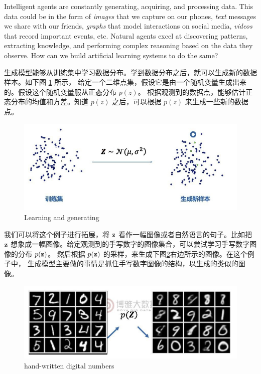 Intelligent agents are constantly generating, acquiring, and processing
data. This data could be in the form of {\em images} that we capture on our
phones, {\em text} messages we share with our friends, {\em graphs} that model
interactions on social media, {\em videos} that record important events,
etc. Natural agents excel at discovering patterns, extracting
knowledge, and performing complex reasoning based on the data they observe. How
can we build artificial learning systems to do the same?

生成模型能够从训练集中学习数据分布。学到数据分布之后，就可以生成新的数据样本。如下图 \ref{fig:dgm_generating_data} 所示，
给定一个二维点集，假设它是由一个随机变量生成出来的。假设这个随机变量服从正态分布 $p(z)$。
根据观测到的数据点，能够估计正态分布的均值和方差。知道 $p(z)$ 之后，可以根据 $p(z)$ 
来生成一些新的数据点。

\begin{figure}[H]
\centering
\includegraphics[scale=0.618]{pix/dgm/generating_data.jpeg}
\caption{Learning and generating}
\label{fig:dgm_generating_data}
\end{figure}

我们可以将这个例子进行拓展，将 $\mathbf{z}$ 看作一幅图像或者自然语言的句子。比如把 $\mathbf{z}$ 
想象成一幅图像。给定观测到的手写数字的图像集合，可以尝试学习手写数字图像的分布 $p(\mathbf{z})$。
然后根据 $p(\mathbf{z})$ 的采样，来生成下图\ref{fig:dgm_digital_numbers}右边所示的图像。在这个例子中，
生成模型主要做的事情是抓住手写数字图像的结构，以生成的类似的图像。

\begin{figure}[H]
\centering
\includegraphics[scale=0.618]{pix/dgm/hand_writn_digitals.jpeg}
\caption{hand-written digital numbers}
\label{fig:dgm_digital_numbers}
\end{figure}



